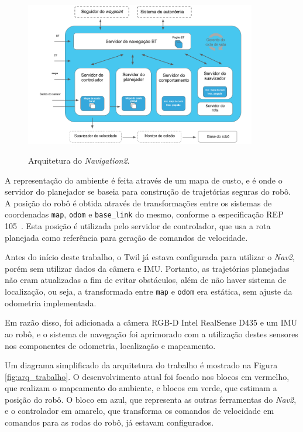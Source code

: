 \documentclass[repeatfields,xlists,xpacks,oneside,yearsonly]{ufrgscca}
\begin{document}
\begin{figure}[h]
    {
        \centering
        \caption{Arquitetura do \textit{Navigation2}.}
        \label{fig:nav2_arc}
        \includegraphics[width=0.9\textwidth]{nav2_architecture_trad.png}\\
    }
    {} %
\end{figure}

A representação do ambiente é feita através de um mapa de custo, e é
onde o servidor do planejador se baseia para construção de
trajetórias seguras do robô. A posição do robô é obtida através de
transformações entre os sistemas de coordenadas \texttt{map},
\texttt{odom} e \texttt{base\_link} do mesmo, conforme a
especificação REP 105~\cite{rep_105}. Esta posição é utilizada pelo
servidor de controlador, que usa a rota planejada como referência
para geração de comandos de velocidade.

Antes do início deste trabalho, o Twil já estava configurada para
utilizar o \textit{Nav2}, porém sem utilizar dados da câmera e IMU.
Portanto, as trajetórias planejadas não eram atualizadas a fim de
evitar obstáculos, além de não haver sistema de localização, ou seja,
a transformada entre \texttt{map} e \texttt{odom} era estática, sem
ajuste da odometria implementada.

Em razão disso, foi adicionada a câmera RGB-D Intel RealSense D435 e
um IMU ao robô, e o sistema de navegação foi aprimorado com a
utilização destes sensores nos componentes de odometria, localização
e mapeamento.

Um diagrama simplificado da arquitetura do trabalho é mostrado na
Figura \ref{fig:arq_trabalho}. O desenvolvimento atual foi focado nos
blocos em vermelho, que realizam o mapeamento do ambiente, e blocos
em verde, que estimam a posição do robô. O bloco em azul, que
representa as outras ferramentas do \textit{Nav2}, e o controlador em
amarelo, que transforma os comandos de velocidade em comandos para as
rodas do robô, já estavam configurados.
\end{document}
